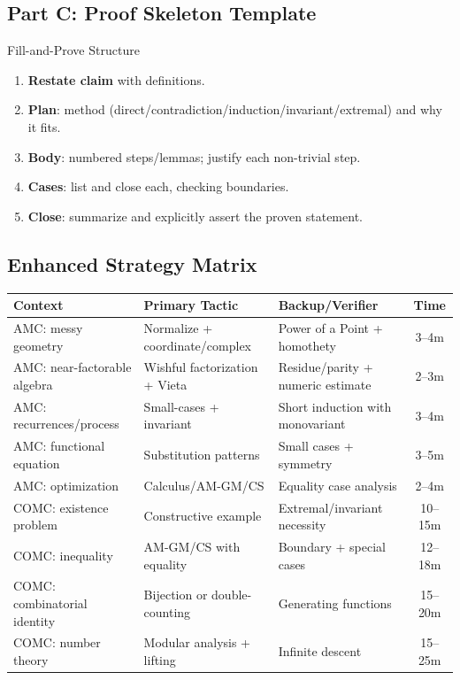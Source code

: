 \documentclass{article}
\begin{document}
\subsection{Part C: Proof Skeleton Template}
\begin{formalbox}{Fill-and-Prove Structure}
\begin{enumerate}[nosep]
    \item \textbf{Restate claim} with definitions.
    \item \textbf{Plan}: method (direct/contradiction/induction/invariant/extremal) and why it fits.
    \item \textbf{Body}: numbered steps/lemmas; justify each non-trivial step.
    \item \textbf{Cases}: list and close each, checking boundaries.
    \item \textbf{Close}: summarize and explicitly assert the proven statement.
\end{enumerate}
\end{formalbox}

\subsection{Enhanced Strategy Matrix}
\begin{center}
\begin{tabularx}{\textwidth}{|l|X|X|c|}
\hline
\textbf{Context} & \textbf{Primary Tactic} & \textbf{Backup/Verifier} & \textbf{Time} \\
\hline
AMC: messy geometry & Normalize + coordinate/complex & Power of a Point + homothety & 3--4m \\
AMC: near-factorable algebra & Wishful factorization + Vieta & Residue/parity + numeric estimate & 2--3m \\
AMC: recurrences/process & Small-cases + invariant & Short induction with monovariant & 3--4m \\
AMC: functional equation & Substitution patterns & Small cases + symmetry & 3--5m \\
AMC: optimization & Calculus/AM-GM/CS & Equality case analysis & 2--4m \\
\hline
COMC: existence problem & Constructive example & Extremal/invariant necessity & 10--15m \\
COMC: inequality & AM-GM/CS with equality & Boundary + special cases & 12--18m \\
COMC: combinatorial identity & Bijection or double-counting & Generating functions & 15--20m \\
COMC: number theory & Modular analysis + lifting & Infinite descent & 15--25m \\
\hline
\end{tabularx}
\end{center}
\end{document}

